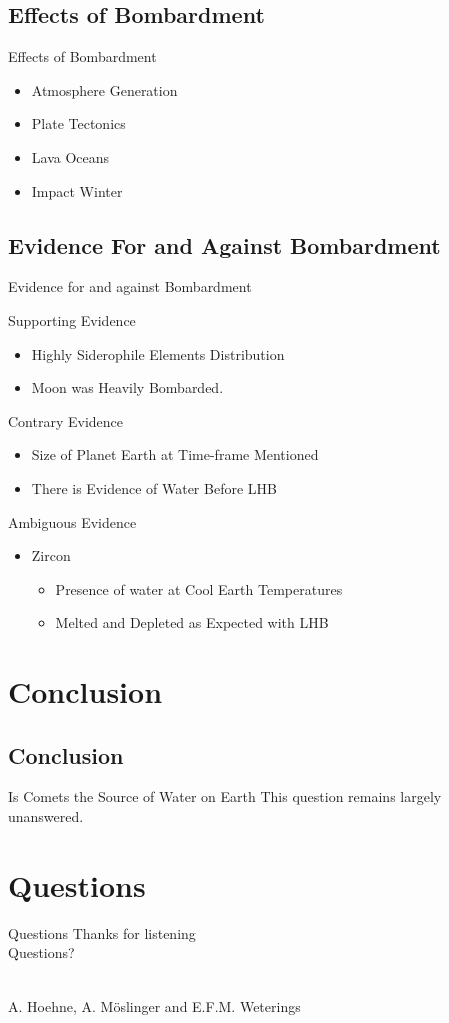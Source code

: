 \documentclass[11pt, aspectratio=169]{beamer}
\begin{document}
\subsection{Effects of Bombardment}
\begin{frame}[t]{Effects of Bombardment}
\begin{itemize}
\item Atmosphere Generation
\item Plate Tectonics
\item Lava Oceans
\item Impact Winter
\end{itemize}
\end{frame}

\subsection{Evidence For and Against Bombardment}
\begin{frame}[t]{Evidence for and against Bombardment}

Supporting Evidence
\begin{itemize}
    \item Highly Siderophile Elements Distribution
    \item Moon was Heavily Bombarded.
\end{itemize}
\medskip
Contrary Evidence
\begin{itemize}
    \item Size of Planet Earth at Time-frame Mentioned
    \item There is Evidence of Water Before LHB
\end{itemize}
\medskip
Ambiguous Evidence
\begin{itemize}
    \item Zircon
        \begin{itemize}
            \item Presence of water at Cool Earth Temperatures
            \item Melted and Depleted as Expected with LHB
        \end{itemize}
\end{itemize}
\end{frame}


\section{Conclusion}
\subsection{Conclusion}
\begin{frame}[t]{Is Comets the Source of Water on Earth}
\centering
\huge This question remains largely unanswered.
\end{frame}

\section{Questions}
\begin{frame}{Questions}
\centering
\Huge Thanks for listening\\

\huge Questions?\\\

\large A. Hoehne, A. M\"{o}slinger and E.F.M. Weterings\\

\end{frame}
\end{document}
